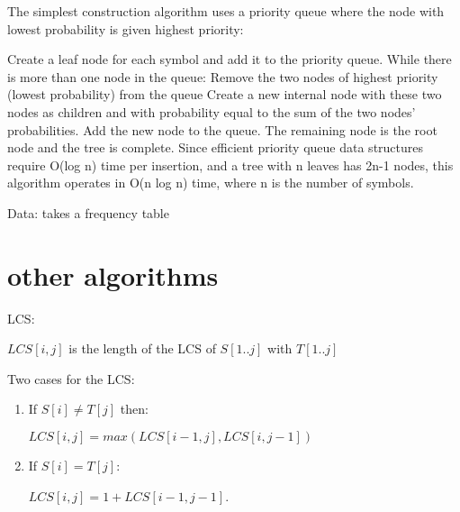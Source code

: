 \documentclass[10 pt]{article}
\begin{document}
\begin{multicols}{2}
The simplest construction algorithm uses a priority queue where the node with lowest probability is given highest priority:

Create a leaf node for each symbol and add it to the priority queue.
While there is more than one node in the queue:
Remove the two nodes of highest priority (lowest probability) from the queue
Create a new internal node with these two nodes as children and with probability equal to the sum of the two nodes' probabilities.
Add the new node to the queue.
The remaining node is the root node and the tree is complete.
Since efficient priority queue data structures require O(log n) time per insertion, and a tree with n leaves has 2n-1 nodes, this algorithm operates in O(n log n) time, where n is the number of symbols.

Data: takes a frequency table


\end{multicols}
\section{other algorithms}
LCS:


$LCS[i,j]$ is the length of the LCS of $S[1..j]$ with $T[1..j]$

Two cases for the LCS:
\begin{enumerate}
\item If $S[i] \not = T[j]$ then:

\hspace{35pt} $LCS[i,j] = max(LCS[i - 1,j], LCS[i,j-1])$

\item If $S[i] = T[j]:$

\hspace{35pt} $LCS[i,j] = 1 + LCS[i-1,j-1]$.
\end{enumerate} \hfill \break
\end{document}
